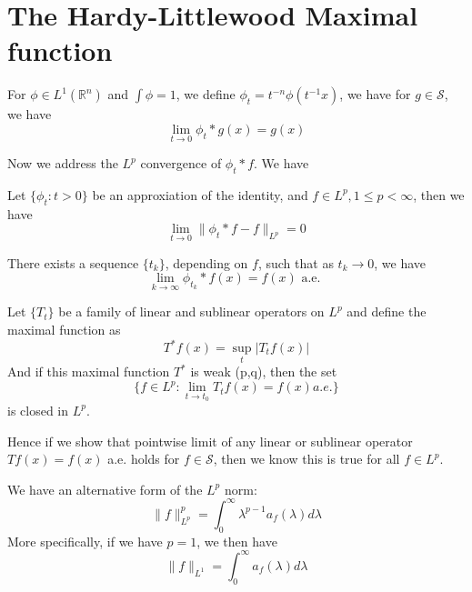 \documentclass[lang=en,10pt, color=black]{../elegantbook}
\newcommand{\R}{\mathbb{R}}
\begin{document}
\chapter{The Hardy-Littlewood Maximal function}
\begin{proposition}
    For $\phi\in L^1(\R^n)$ and $\int\phi=1$, we define $\phi_t=t^{-n}\phi(t^{-1}x)$, we have for $g\in\mathcal{S}$, we have
    \begin{equation*}
        \lim_{t\to 0}\phi_t\ast g(x)=g(x)
    \end{equation*}
\end{proposition}
Now we address the $L^p$ convergence of $\phi_t\ast f$. We have
\begin{theorem}
    Let $\{\phi_t: t>0\}$ be an approxiation of the identity, and $f\in L^p, 1\leq p<\infty$, then we have
    \begin{equation*}
        \lim_{t\to 0}\|\phi_t\ast f-f\|_{L^p}=0
    \end{equation*}
\end{theorem}
\begin{corollary}
    There exists a sequence $\{t_k\}$, depending on $f$, such that as $t_k\to 0$, we have
    \begin{equation*}
        \lim_{k\to\infty}\phi_{t_k}\ast f(x)=f(x) \text{ a.e. }
    \end{equation*}
\end{corollary}

\begin{theorem}
    Let $\{T_t\}$ be a family of linear and sublinear operators on $L^p$ and define the maximal function as 
    \begin{equation*}
        T^*f(x)=\sup_t|T_tf(x)|
    \end{equation*}
    And if this maximal function $T^*$ is weak (p,q), then the set
    \begin{equation*}
        \{f\in L^p: \lim_{t\to t_0}T_tf(x)=f(x)a.e. \}
    \end{equation*}
    is closed in $L^p$.
\end{theorem}
Hence if we show that pointwise limit of any linear or sublinear operator $Tf(x)=f(x)$ a.e. holds for $f\in\mathcal{S}$, then we know this is true for all $f\in L^p$.

\begin{proposition}
    We have an alternative form of the $L^p$ norm:
    \begin{equation*}
        \|f\|_{L^p}^p=\int_0^\infty\lambda^{p-1}a_f(\lambda)d\lambda
    \end{equation*}
    More specifically, if we have $p=1$, we then have
    \begin{equation*}
        \|f\|_{L^1}=\int_0^\infty a_f(\lambda)d\lambda
    \end{equation*}
\end{proposition}
\end{document}
